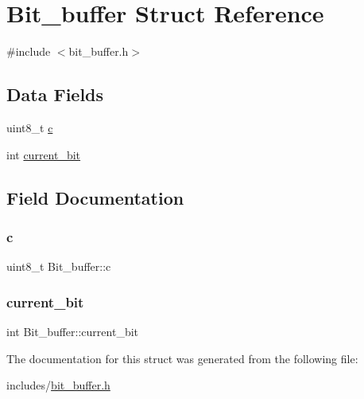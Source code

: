 \hypertarget{structBit__buffer}{}\section{Bit\+\_\+buffer Struct Reference}
\label{structBit__buffer}


{\ttfamily \#include $<$bit\+\_\+buffer.\+h$>$}

\subsection*{Data Fields}
\begin{DoxyCompactItemize}
\item 
uint8\+\_\+t \hyperlink{structBit__buffer_a6ca7d4f24eb753212a216749440aa1ae}{c}
\item 
int \hyperlink{structBit__buffer_aa0ab84e247b8a29953ab53e2068c522f}{current\+\_\+bit}
\end{DoxyCompactItemize}


\subsection{Field Documentation}
\mbox{\label{structBit__buffer_a6ca7d4f24eb753212a216749440aa1ae}} 
\subsubsection{\texorpdfstring{c}{c}}
{\footnotesize\ttfamily uint8\+\_\+t Bit\+\_\+buffer\+::c}

\mbox{\label{structBit__buffer_aa0ab84e247b8a29953ab53e2068c522f}} 
\subsubsection{\texorpdfstring{current\+\_\+bit}{current\_bit}}
{\footnotesize\ttfamily int Bit\+\_\+buffer\+::current\+\_\+bit}



The documentation for this struct was generated from the following file\+:\begin{DoxyCompactItemize}
\item 
includes/\hyperlink{bit__buffer_8h}{bit\+\_\+buffer.\+h}\end{DoxyCompactItemize}
